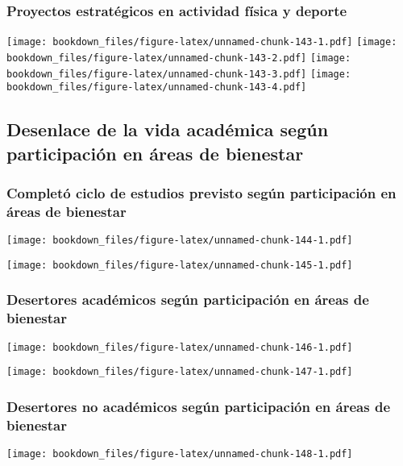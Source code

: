 \documentclass[]{article}
\theoremstyle{definition}
\theoremstyle{definition}
\theoremstyle{definition}
\theoremstyle{remark}
\begin{document}
\subsubsection{Proyectos estratégicos en actividad física y
deporte}\label{proyectos-estrategicos-en-actividad-fisica-y-deporte}

\texttt{[image: bookdown\_files/figure-latex/unnamed-chunk-143-1.pdf]}
\texttt{[image: bookdown\_files/figure-latex/unnamed-chunk-143-2.pdf]}
\texttt{[image: bookdown\_files/figure-latex/unnamed-chunk-143-3.pdf]}
\texttt{[image: bookdown\_files/figure-latex/unnamed-chunk-143-4.pdf]}

\subsection{Desenlace de la vida académica según participación en áreas
de
bienestar}\label{desenlace-de-la-vida-academica-segun-participacion-en-areas-de-bienestar}

\subsubsection{Completó ciclo de estudios previsto según participación
en áreas de
bienestar}\label{completo-ciclo-de-estudios-previsto-segun-participacion-en-areas-de-bienestar}

\texttt{[image: bookdown\_files/figure-latex/unnamed-chunk-144-1.pdf]}

\texttt{[image: bookdown\_files/figure-latex/unnamed-chunk-145-1.pdf]}

\subsubsection{Desertores académicos según participación en áreas de
bienestar}\label{desertores-academicos-segun-participacion-en-areas-de-bienestar}

\texttt{[image: bookdown\_files/figure-latex/unnamed-chunk-146-1.pdf]}

\texttt{[image: bookdown\_files/figure-latex/unnamed-chunk-147-1.pdf]}

\subsubsection{Desertores no académicos según participación en áreas de
bienestar}\label{desertores-no-academicos-segun-participacion-en-areas-de-bienestar}

\texttt{[image: bookdown\_files/figure-latex/unnamed-chunk-148-1.pdf]}
\end{document}
